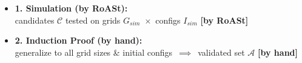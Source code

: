 \begin{frame}{}

\vspace{0.6cm}
\begin{itemize}\setlength\itemsep{0.8cm}
    \item<1-> \textbf{1. Simulation (by RoASt):}\\ candidates $\mathcal{C}$ tested on grids $G_{sim}$~$\times$~configs $I_{sim}$ \textbf{\textcolor{accent}{\scriptsize [by RoASt]}}\pause
          
    \item<2-> \textbf{2. Induction Proof (by hand):}\\ generalize to all grid sizes \& initial configs~$\implies$~validated set $\mathcal{A}$ \textbf{\textcolor{accent}{\scriptsize [by hand]}}
\end{itemize}

\end{frame}
